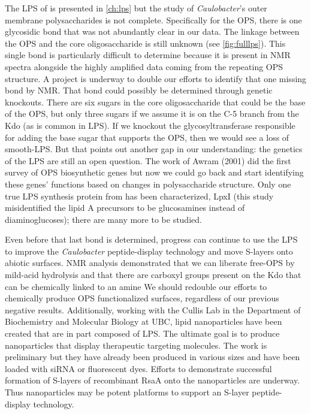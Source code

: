 The \ac{LPS} of \caulobacter{} is presented in \cref{ch:lps} but the study of
\textit{Caulobacter}'s outer membrane polysaccharides is not complete.
Specifically for the \ac{OPS}, there is one glycosidic bond that was not
abundantly clear in our data. The linkage between the \ac{OPS} and the core
oligosaccharide is still unknown (see \cref{fig:fulllps}). This  single bond is particularly difficult to determine because it is present in \ac{NMR} spectra alongside the highly amplified data coming from the repeating \ac{OPS} structure. A project is underway to double our efforts to identify that one missing bond by \ac{NMR}. That bond could possibly  be determined through genetic knockouts. There are six sugars in the core oligosaccharide that could be the base of the \ac{OPS}, but only three sugars if we assume it is on the C-5 branch from the Kdo (as is common in LPS). If we knockout the glycosyltransferase responsible for adding the base sugar that supports the \ac{OPS}, then we would see a loss of smooth-\ac{LPS}. But that points out another gap in our understanding: the genetics of the \caulobacter{} \ac{LPS} are still an open question. The work of Awram \etal{} (2001) did the first survey of \ac{OPS} biosynthetic genes but now we could go back and start identifying these genes' functions based on changes in polysaccharide structure. Only one true \ac{LPS} synthesis protein from \caulobacter{} has been characterized, LpxI (this study misidentified the \caulobacter lipid A precursors to be glucosamines instead of diaminoglucoses); there are many more to be studied. 

Even before that last bond is determined, progress can continue to use the \ac{LPS} to improve the \textit{Caulobacter} peptide-display technology and move \acp{S-layer} onto abiotic surfaces. \Ac{NMR} analysis demonstrated that we can liberate free-\ac{OPS} by mild-acid hydrolysis and that there are carboxyl groups present on the Kdo that can be chemically linked to an amine We should redouble our efforts to chemically produce \ac{OPS} functionalized surfaces, regardless of our previous negative results.  Additionally, working with the Cullis Lab in the Department of Biochemistry and Molecular Biology at UBC, lipid nanoparticles have been created that are in part  composed of \caulobacter \ac{LPS}. The ultimate goal is to produce nanoparticles that display therapeutic targeting molecules. The work is preliminary but they have already been produced in various sizes and have been loaded with siRNA or fluorescent dyes. Efforts to demonstrate successful formation of \acp{S-layer} of recombinant RsaA onto the nanoparticles are underway. Thus nanoparticles  may be potent platforms to support an \ac{S-layer} peptide-display technology.

